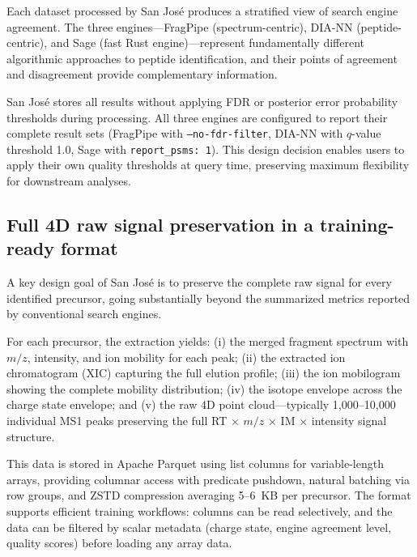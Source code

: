\documentclass[10pt,twoside]{article}
\begin{document}
Each dataset processed by San Jos\'{e} produces a stratified view of search engine agreement.
The three engines---FragPipe (spectrum-centric), DIA-NN (peptide-centric), and Sage (fast Rust engine)---represent fundamentally different algorithmic approaches to peptide identification, and their points of agreement and disagreement provide complementary information.


San Jos\'{e} stores all results without applying FDR or posterior error probability thresholds during processing.
All three engines are configured to report their complete result sets (FragPipe with \texttt{--no-fdr-filter}, DIA-NN with $q$-value threshold 1.0, Sage with \texttt{report\_psms: 1}).
This design decision enables users to apply their own quality thresholds at query time, preserving maximum flexibility for downstream analyses.

\subsection*{Full 4D raw signal preservation in a training-ready format}

A key design goal of San Jos\'{e} is to preserve the complete raw signal for every identified precursor, going substantially beyond the summarized metrics reported by conventional search engines.

For each precursor, the extraction yields: (i) the merged fragment spectrum with $m/z$, intensity, and ion mobility for each peak; (ii) the extracted ion chromatogram (XIC) capturing the full elution profile; (iii) the ion mobilogram showing the complete mobility distribution; (iv) the isotope envelope across the charge state envelope; and (v) the raw 4D point cloud---typically 1,000--10,000 individual MS1 peaks preserving the full RT $\times$ $m/z$ $\times$ IM $\times$ intensity signal structure.

This data is stored in Apache Parquet using list columns for variable-length arrays, providing columnar access with predicate pushdown, natural batching via row groups, and ZSTD compression averaging 5--6~KB per precursor.
The format supports efficient training workflows: columns can be read selectively, and the data can be filtered by scalar metadata (charge state, engine agreement level, quality scores) before loading any array data.
\end{document}
